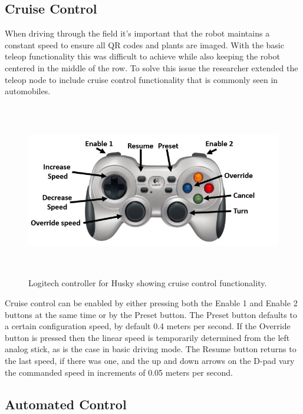 \subsection{Cruise Control}

When driving through the field it's important that the robot maintains a constant speed to ensure all QR codes and plants are imaged.  With the basic teleop functionality this was difficult to achieve while also keeping the robot centered in the middle of the row. To solve this issue the researcher extended the teleop node to include cruise control functionality that is commonly seen in automobiles.  

\begin{figure}[htb]
	\centering
    \includegraphics[height=3in]{figures/logitech_controller_labelled.jpg}
    \caption[Cruise control buttons]{Logitech controller for Husky showing cruise control functionality.}
    \label{figure:cruise_control}
\end{figure}

Cruise control can be enabled by either pressing both the Enable 1 and Enable 2 buttons at the same time or by the Preset button.  The Preset button defaults to a certain configuration speed, by default 0.4 meters per second.  If the Override button is pressed then the linear speed is temporarily determined from the left analog stick, as is the case in basic driving mode.  The Resume button returns to the last speed, if there was one, and the up and down arrows on the D-pad vary the commanded speed in increments of 0.05 meters per second.    

\subsection{Automated Control}
\label{section:automated_control}

